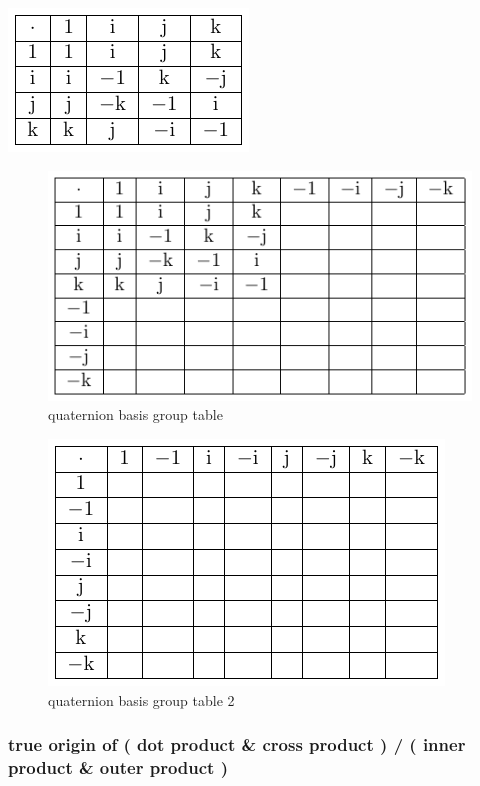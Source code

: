 \documentclass[
]{book}
\theoremstyle{definition}
\theoremstyle{definition}
\theoremstyle{definition}
\theoremstyle{definition}
\theoremstyle{remark}
\begin{document}
\includegraphics{202403251511-quaternion_files/figure-latex/unnamed-chunk-1-1.pdf}

\begin{figure}
\centering
\includegraphics{202403251511-quaternion_files/figure-latex/unnamed-chunk-2-1.pdf}
\caption{\label{fig:unnamed-chunk-2}quaternion basis group table}
\end{figure}

\begin{figure}
\centering
\includegraphics{202403251511-quaternion_files/figure-latex/unnamed-chunk-3-1.pdf}
\caption{\label{fig:unnamed-chunk-3}quaternion basis group table 2}
\end{figure}

\subsubsection{true origin of ( dot product \& cross product ) / ( inner product \& outer product )}\label{true-origin-of-dot-product-cross-product-inner-product-outer-product}
\end{document}
